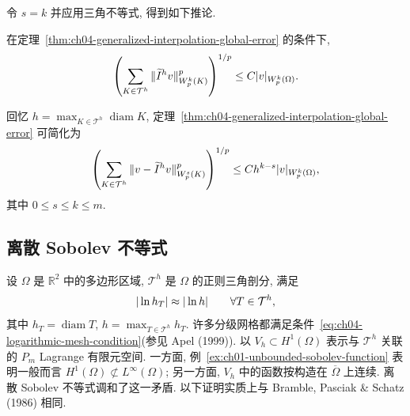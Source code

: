 令 $s=k$ 并应用三角不等式, 得到如下推论.

\setcounter{thmcount}{14}
\begin{Corollary}
\label{cor:ch04-generalized-interpolant-stability}
在定理~\ref{thm:ch04-generalized-interpolation-global-error} 的条件下,
\begin{equation}
\MathBookFormulaID{formula-ch04-generalized-interpolant-stability}
\label{eq:ch04-generalized-interpolant-stability}
\left(\sum_{K\in\mathcal T^h}
\|\widetilde I^h v\|_{W_p^k(K)}^p\right)^{1/p}
\leq C|v|_{W_p^k(\Omega)}.
\end{equation}
\end{Corollary}

回忆 $h=\max_{K\in\mathcal T^h}\operatorname{diam}K$, 定理~\ref{thm:ch04-generalized-interpolation-global-error} 可简化为
\begin{equation}
\MathBookFormulaID{formula-ch04-generalized-interpolation-simplified-error}
\label{eq:ch04-generalized-interpolation-simplified-error}
\left(\sum_{K\in\mathcal T^h}
\|v-\widetilde I^h v\|_{W_p^s(K)}^p\right)^{1/p}
\leq Ch^{k-s}|v|_{W_p^k(\Omega)},
\end{equation}
其中 $0\leq s\leq k\leq m$.

\subsection{离散 Sobolev 不等式}
\label{sec:ch04-discrete-sobolev-inequality}
\setcounter{thmcount}{0}
\setcounter{equation}{0}

设 $\Omega$ 是 $\mathbb R^2$ 中的多边形区域, $\mathcal T^h$ 是 $\Omega$ 的正则三角剖分, 满足
\begin{equation}
\MathBookFormulaID{formula-ch04-logarithmic-mesh-condition}
\label{eq:ch04-logarithmic-mesh-condition}
|\ln h_T|\approx|\ln h|
\qquad\forall T\in\mathcal T^h,
\end{equation}
其中 $h_T=\operatorname{diam}T$, $h=\max_{T\in\mathcal T^h}h_T$. 许多分级网格都满足条件~\eqref{eq:ch04-logarithmic-mesh-condition}(参见 Apel (1999)). 以 $V_h\subset H^1(\Omega)$ 表示与 $\mathcal T^h$ 关联的 $P_m$ Lagrange 有限元空间. 一方面, 例~\ref{ex:ch01-unbounded-sobolev-function} 表明一般而言 $H^1(\Omega)\not\subset L^\infty(\Omega)$; 另一方面, $V_h$ 中的函数按构造在 $\overline\Omega$ 上连续. 离散 Sobolev 不等式调和了这一矛盾. 以下证明实质上与 Bramble, Pasciak \& Schatz (1986) 相同.

